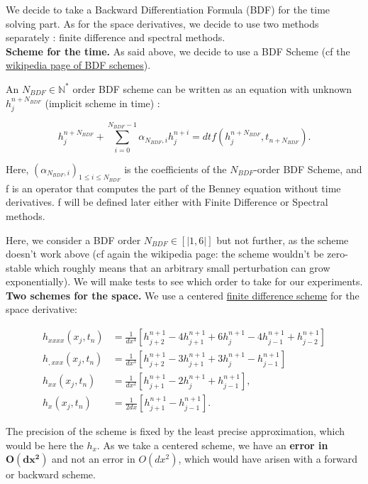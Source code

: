 \documentclass[12pt]{article}
\begin{document}
We decide to take a Backward Differentiation Formula (BDF) for the time solving part. As for the space derivatives, we decide to use two methods separately : finite difference and spectral methods. 
\\

\textbf{Scheme for the time.}
As said above, we decide to use a BDF Scheme (cf the \href{https://en.wikipedia.org/wiki/Backward_differentiation_formula}{wikipedia page of BDF schemes}).

An $N_{BDF}\in \mathbb{N}^*$ order BDF scheme can be written as an equation with unknown $h_j^{n+N_{BDF}}$ (implicit scheme in time) :

\begin{equation}
    h_{j}^{n+N_{BDF}} + \sum_{i=0}^{N_{BDF}-1} \alpha_{N_{BDF}, i}h_{j}^{n+i} = dtf(h_j^{n+N_{BDF}}, t_{n+N_{BDF}}).
\end{equation}

Here, $(\alpha_{N_{BDF},i})_{1\leq i \leq N_{BDF}}$ is the coefficients of the $N_{BDF}$-order BDF Scheme, and f is an operator that computes the part of the Benney equation without time derivatives. f will be defined later either with Finite Difference or Spectral methods.

Here, we consider a BDF order $N_{BDF}\in [|1,6|]$ but not further, as the scheme doesn't work above (cf again the wikipedia page: the scheme wouldn't be zero-stable which roughly means that an arbitrary small perturbation can grow exponentially). We will make tests to see which order to take for our experiments.
\\

\textbf{Two schemes for the space.}
We use a centered \underline{finite difference scheme} for the space derivative: 

\begin{equation}
\begin{aligned}
    h_{xxxx}(x_j, t_n) &= \frac{1}{dx^4}[h_{j+2}^{n+1} -4h_{j+1}^{n+1} +6h_{j}^{n+1} - 4h_{j-1}^{n+1} + h_{j-2}^{n+1}]\\   
    h_{,xxx}(x_j,t_n)&=\frac{1}{dx^3}[h^{n+1}_{j+2}-3h^{n+1}_{j+1} +3h^{n+1}_{j}-h^{n+1}_{j-1}]\\
  h_{xx}(x_j, t_n) &= \frac{1}{dx^2}[h_{j+1}^{n+1} -2h_{j}^{n+1} +h_{j-1}^{n+1}],\\ 
  h_{x}(x_j, t_n) &= \frac{1}{2dx}[h_{j+1}^{n+1} -h_{j-1}^{n+1}] . 
\end{aligned}
\end{equation}

The precision of the scheme is fixed by the least precise approximation, which would be here the $h_x$. As we take a centered scheme, we have an \textbf{error in }$\boldsymbol{O(dx^2 )}$ and not an error in $O(dx^2)$, which would have arisen with a forward or backward scheme. \\
\end{document}
